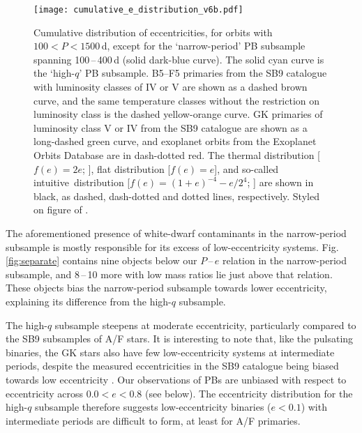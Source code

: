 \documentclass[a4paper,fleqn,usenatbib]{mnras}
\begin{document}
\begin{figure}
\begin{center}
\texttt{[image: cumulative\_e\_distribution\_v6b.pdf]}
\caption{Cumulative distribution of eccentricities, for orbits with $100 < P < 1500$\,d, except for the `narrow-period' PB subsample spanning 100\,--\,400\,d (solid dark-blue curve). The solid cyan curve is the `high-$q$' PB subsample. B5--F5 primaries from the SB9 catalogue with luminosity classes of IV or V are shown as a dashed brown curve, and the same temperature classes without the restriction on luminosity class is the dashed yellow-orange curve. GK primaries of luminosity class V or IV from the SB9 catalogue are shown as a long-dashed green curve, and exoplanet orbits from the Exoplanet Orbits Database \citep{hanetal2014} are in dash-dotted red. The thermal distribution [$f(e) = 2e$; \citealt{ambartsumian1937,kroupa2008}], flat distribution [$f(e) = e$], and so-called intuitive\protect\footnotemark\ distribution [$f(e) = (1+e)^{-4} - e/2^4$; \citet{shen&turner2008}] are shown in black, as dashed, dash-dotted and dotted lines, respectively. Styled on figure of \citet{duchene&kraus2013}.}
\label{fig:cumulative_e}
\end{center}
\end{figure}


The aforementioned presence of white-dwarf contaminants in the narrow-period subsample is mostly responsible for its excess of low-eccentricity systems. Fig.\,\ref{fig:separate} contains nine objects below our $P$\,--\,$e$ relation in the narrow-period subsample, and 8\,--\,10 more with low mass ratios lie just above that relation. These objects bias the narrow-period subsample towards lower eccentricity, explaining its difference from the high-$q$ subsample.

The high-$q$ subsample steepens at moderate eccentricity, particularly compared to the SB9 subsamples of A/F stars. It is interesting to note that, like the pulsating binaries, the GK stars also have few low-eccentricity systems at intermediate periods, despite the measured eccentricities in the SB9 catalogue being biased towards low eccentricity \citep{tokovinin&kiyaeva2016}. Our observations of PBs are unbiased with respect to eccentricity across $0.0 < e < 0.8$ (see below).  The eccentricity distribution for the high-$q$ subsample therefore suggests low-eccentricity binaries ($e < 0.1$) with intermediate periods are difficult to form, at least for A/F primaries.
\end{document}
